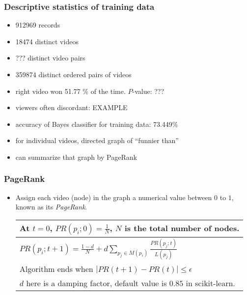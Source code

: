 \documentclass[fleqn]{beamer}
\begin{document}
\begin{frame}
\frametitle{Descriptive statistics of training data}
      \begin{itemize}
         \item 912969 records
         \item 18474 distinct videos
         \item ??? distinct video pairs
         \item 359874 distinct ordered pairs of videos
         \item right video won 51.77 \% of the time. $P$-value: ???
         \item viewers often discordant: EXAMPLE
         \item accuracy of Bayes classifier for training data: 73.449\%
         \item for individual videos, directed graph of ``funnier than''
         \item can summarize that graph by PageRank
     \end{itemize}

\end{frame}

\begin{frame}
\frametitle{PageRank}
      \begin{itemize}
         \item Assign each video (node) in the graph a numerical value
         between $0$ to $1$, known as its \textsl{PageRank}.
         \begin{center}
         \begin{tabular}{| l |}
         \hline
         At $t=0$, $PR(p_{i};0) = \frac{1}{N}$, $N$ is the total number of nodes. \\ \hline
         $PR(p_{i};t+1) = \frac{1-d}{N} + d \sum_{p_{j} \in M(p_{i})} \frac{PR(p_{j};t)}{L(p_{j})}$ \\ \hline
         Algorithm ends when $|PR(t+1) - PR(t)| \le \epsilon$ \\ \hline
         $d$ here is a damping factor, default value is $0.85$ in scikit-learn. \\
         \hline
         \end{tabular}
         \end{center}
     \end{itemize}

\end{frame}
\end{document}
